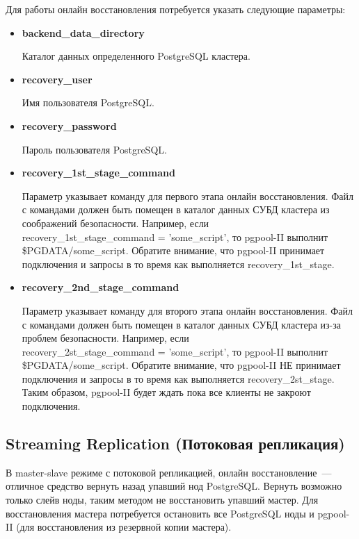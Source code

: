 Для работы онлайн восстановления потребуется указать следующие параметры:
\begin{itemize}
\item \textbf{backend\_data\_directory}

Каталог данных определенного PostgreSQL кластера.

\item \textbf{recovery\_user}

Имя пользователя PostgreSQL.

\item \textbf{recovery\_password}

Пароль пользователя PostgreSQL.

\item \textbf{recovery\_1st\_stage\_command}

Параметр указывает команду для первого этапа онлайн восстановления. 
Файл с командами должен быть помещен в каталог данных СУБД кластера из соображений безопасности. 
Например, если \\recovery\_1st\_stage\_command = 'some\_script', 
то pgpool-II выполнит \$PGDATA/some\_script. 
Обратите внимание, что pgpool-II принимает подключения и запросы в то время как выполняется recovery\_1st\_stage.

\item \textbf{recovery\_2nd\_stage\_command}

Параметр указывает команду для второго этапа онлайн восстановления. 
Файл с командами должен быть помещен в каталог данных СУБД кластера из-за проблем безопасности. 
Например, если \\recovery\_2st\_stage\_command = 'some\_script', 
то pgpool-II выполнит \$PGDATA/some\_script. 
Обратите внимание, что pgpool-II НЕ принимает подключения и запросы в то время как выполняется recovery\_2st\_stage.
Таким образом, pgpool-II будет ждать пока все клиенты не закроют подключения.

\end{itemize}


\subsection{Streaming Replication (Потоковая репликация)}
В master-slave режиме с потоковой репликацией, онлайн восстановление~--- отличное средство вернуть назад упавший нод PostgreSQL. 
Вернуть возможно только слейв ноды, таким методом не восстановить упавший мастер. Для восстановления мастера потребуется остановить 
все PostgreSQL ноды и pgpool-II (для восстановления из резервной копии мастера).

